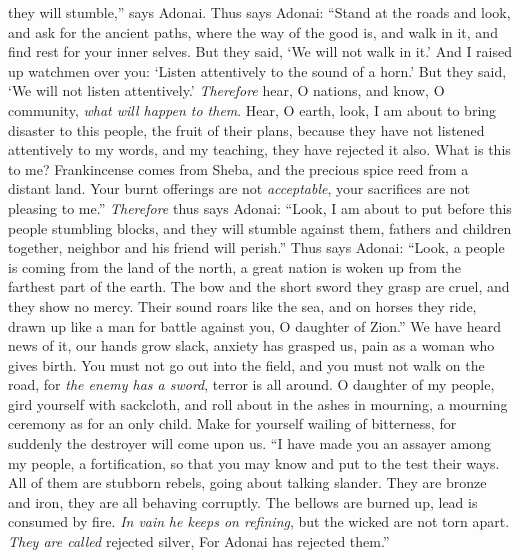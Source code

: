 \begin{biblechapter}
they will stumble,” says Adonai.
\verse Thus says Adonai: “Stand at the roads and look, 
and ask for the ancient paths, where the way of the good is, 
and walk in it, and find rest for your inner selves. 
But they said, ‘We will not walk in it.’
\verse And I raised up watchmen over you: 
‘Listen attentively to the sound of a horn.’ 
But they said, ‘We will not listen attentively.’
\verse \textit{Therefore} hear, O nations, and know, O community, 
\textit{what will happen to them}.
\verse Hear, O earth, 
look, I am about to bring disaster to this people, 
the fruit of their plans, 
because they have not listened attentively to my words, 
and my teaching, they have rejected it also.
\verse What is this to me? 
Frankincense comes from Sheba, 
and the precious spice reed from a distant land. 
Your burnt offerings are not \textit{acceptable}, 
your sacrifices are not pleasing to me.”
\verse \textit{Therefore} thus says Adonai: 
“Look, I am about to put before this people stumbling blocks, 
and they will stumble against them, 
fathers and children together, 
neighbor and his friend will perish.”
\verse Thus says Adonai: 
“Look, a people is coming from the land of the north, 
a great nation is woken up from the farthest part of the earth.
\verse The bow and the short sword they grasp are cruel, 
and they show no mercy. 
Their sound roars like the sea, and on horses they ride, 
drawn up like a man for battle against you, O daughter of Zion.”
\verse We have heard news of it, 
our hands grow slack, 
anxiety has grasped us, 
pain as a woman who gives birth.
\verse You must not go out into the field, 
and you must not walk on the road, 
for \textit{the enemy has a sword}, 
terror is all around.
\verse O daughter of my people, 
gird yourself with sackcloth, 
and roll about in the ashes in mourning, 
a mourning ceremony as for an only child. 
Make for yourself wailing of bitterness, 
for suddenly the destroyer will come upon us.
\verse “I have made you an assayer among my people, a fortification, 
so that you may know and put to the test their ways.
\verse All of them are stubborn rebels, 
going about talking slander. 
They are bronze and iron, 
they are all behaving corruptly.
\verse The bellows are burned up, 
lead is consumed by fire. 
\textit{In vain} \textit{he keeps on refining}, 
but the wicked are not torn apart.
\verse \textit{They are called} rejected silver, 
For Adonai has rejected them.”
\end{biblechapter}

